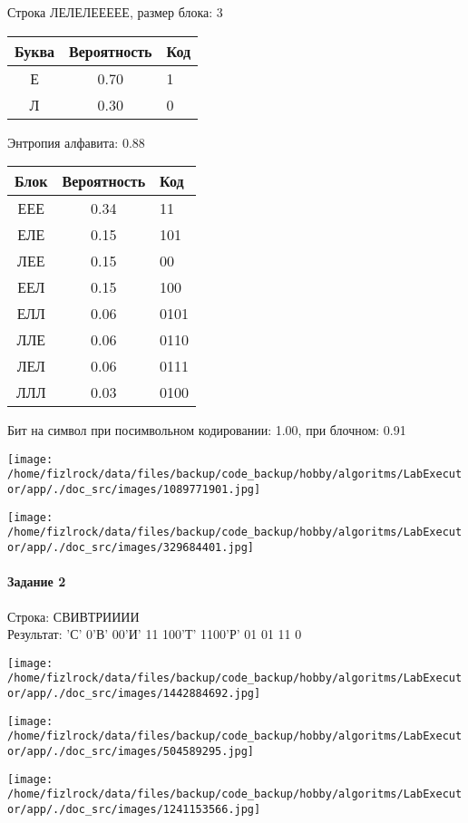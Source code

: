 \documentclass[a4paper, 12pt]{article}
\begin{document}
Строка ЛЕЛЕЛЕЕЕЕЕ, размер блока: 3
\begin{center}
 \begin{tabular}{ |c|c|l| } 
  \hline
     Буква & Вероятность & Код\\ \hline
Е & 0.70 & 1\\\hline
Л & 0.30 & 0
\\ \hline \end{tabular}
\end{center}
Энтропия алфавита: 0.88
\begin{center}
 \begin{tabular}{ |c|c|l| } 
  \hline
     Блок & Вероятность & Код\\ \hline
ЕЕЕ & 0.34 & 11\\\hline
ЕЛЕ & 0.15 & 101\\\hline
ЛЕЕ & 0.15 & 00\\\hline
ЕЕЛ & 0.15 & 100\\\hline
ЕЛЛ & 0.06 & 0101\\\hline
ЛЛЕ & 0.06 & 0110\\\hline
ЛЕЛ & 0.06 & 0111\\\hline
ЛЛЛ & 0.03 & 0100
\\ \hline \end{tabular}
\end{center}
Бит на символ при посимвольном кодировании: 1.00, при блочном: 0.91

\texttt{[image: /home/fizlrock/data/files/backup/code\_backup/hobby/algoritms/LabExecutor/app/./doc\_src/images/1089771901.jpg]}

\texttt{[image: /home/fizlrock/data/files/backup/code\_backup/hobby/algoritms/LabExecutor/app/./doc\_src/images/329684401.jpg]}
\pagebreak
\paragraph{Задание 2}

Строка: 
СВИВТРИИИИ\\
Результат: 'С' 0'В' 00'И' 11 100'Т' 1100'Р' 01 01 11 0

\texttt{[image: /home/fizlrock/data/files/backup/code\_backup/hobby/algoritms/LabExecutor/app/./doc\_src/images/1442884692.jpg]}

\texttt{[image: /home/fizlrock/data/files/backup/code\_backup/hobby/algoritms/LabExecutor/app/./doc\_src/images/504589295.jpg]}

\texttt{[image: /home/fizlrock/data/files/backup/code\_backup/hobby/algoritms/LabExecutor/app/./doc\_src/images/1241153566.jpg]}
\end{document}
